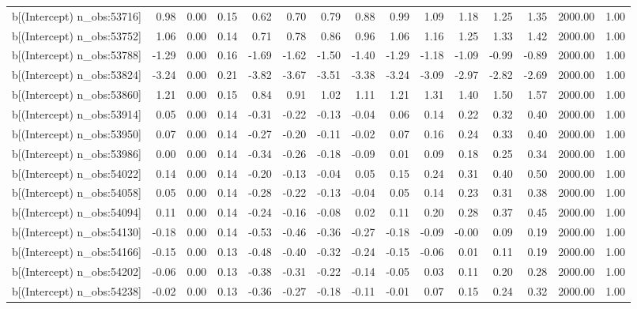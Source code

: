 \begin{table}[ht]
\begin{tabular}{rrrrrrrrrrrrrrr}
  b[(Intercept) n\_obs:53716] & 0.98 & 0.00 & 0.15 & 0.62 & 0.70 & 0.79 & 0.88 & 0.99 & 1.09 & 1.18 & 1.25 & 1.35 & 2000.00 & 1.00 \\ 
  b[(Intercept) n\_obs:53752] & 1.06 & 0.00 & 0.14 & 0.71 & 0.78 & 0.86 & 0.96 & 1.06 & 1.16 & 1.25 & 1.33 & 1.42 & 2000.00 & 1.00 \\ 
  b[(Intercept) n\_obs:53788] & -1.29 & 0.00 & 0.16 & -1.69 & -1.62 & -1.50 & -1.40 & -1.29 & -1.18 & -1.09 & -0.99 & -0.89 & 2000.00 & 1.00 \\ 
  b[(Intercept) n\_obs:53824] & -3.24 & 0.00 & 0.21 & -3.82 & -3.67 & -3.51 & -3.38 & -3.24 & -3.09 & -2.97 & -2.82 & -2.69 & 2000.00 & 1.00 \\ 
  b[(Intercept) n\_obs:53860] & 1.21 & 0.00 & 0.15 & 0.84 & 0.91 & 1.02 & 1.11 & 1.21 & 1.31 & 1.40 & 1.50 & 1.57 & 2000.00 & 1.00 \\ 
  b[(Intercept) n\_obs:53914] & 0.05 & 0.00 & 0.14 & -0.31 & -0.22 & -0.13 & -0.04 & 0.06 & 0.14 & 0.22 & 0.32 & 0.40 & 2000.00 & 1.00 \\ 
  b[(Intercept) n\_obs:53950] & 0.07 & 0.00 & 0.14 & -0.27 & -0.20 & -0.11 & -0.02 & 0.07 & 0.16 & 0.24 & 0.33 & 0.40 & 2000.00 & 1.00 \\ 
  b[(Intercept) n\_obs:53986] & 0.00 & 0.00 & 0.14 & -0.34 & -0.26 & -0.18 & -0.09 & 0.01 & 0.09 & 0.18 & 0.25 & 0.34 & 2000.00 & 1.00 \\ 
  b[(Intercept) n\_obs:54022] & 0.14 & 0.00 & 0.14 & -0.20 & -0.13 & -0.04 & 0.05 & 0.15 & 0.24 & 0.31 & 0.40 & 0.50 & 2000.00 & 1.00 \\ 
  b[(Intercept) n\_obs:54058] & 0.05 & 0.00 & 0.14 & -0.28 & -0.22 & -0.13 & -0.04 & 0.05 & 0.14 & 0.23 & 0.31 & 0.38 & 2000.00 & 1.00 \\ 
  b[(Intercept) n\_obs:54094] & 0.11 & 0.00 & 0.14 & -0.24 & -0.16 & -0.08 & 0.02 & 0.11 & 0.20 & 0.28 & 0.37 & 0.45 & 2000.00 & 1.00 \\ 
  b[(Intercept) n\_obs:54130] & -0.18 & 0.00 & 0.14 & -0.53 & -0.46 & -0.36 & -0.27 & -0.18 & -0.09 & -0.00 & 0.09 & 0.19 & 2000.00 & 1.00 \\ 
  b[(Intercept) n\_obs:54166] & -0.15 & 0.00 & 0.13 & -0.48 & -0.40 & -0.32 & -0.24 & -0.15 & -0.06 & 0.01 & 0.11 & 0.19 & 2000.00 & 1.00 \\ 
  b[(Intercept) n\_obs:54202] & -0.06 & 0.00 & 0.13 & -0.38 & -0.31 & -0.22 & -0.14 & -0.05 & 0.03 & 0.11 & 0.20 & 0.28 & 2000.00 & 1.00 \\ 
  b[(Intercept) n\_obs:54238] & -0.02 & 0.00 & 0.13 & -0.36 & -0.27 & -0.18 & -0.11 & -0.01 & 0.07 & 0.15 & 0.24 & 0.32 & 2000.00 & 1.00 \\ 

\end{tabular}
\end{table}
